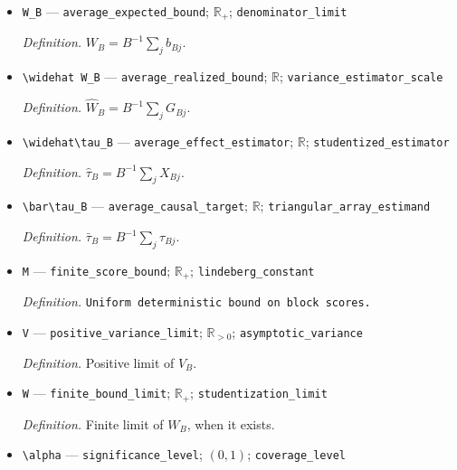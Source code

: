 \documentclass{article}
\begin{document}
\begin{itemize}
  \par\smallskip\noindent\emph{Definition.} \(V_B=B^{-1}\sum_j\sigma_{Bj}^2\).
  \item \texttt{W\_\allowbreak{}B} --- \texttt{average\_\allowbreak{}expected\_\allowbreak{}bound}; \(\mathbb R_+\); \texttt{denominator\_\allowbreak{}limit}
  \par\smallskip\noindent\emph{Definition.} \(W_B=B^{-1}\sum_jb_{Bj}\).
  \item \texttt{\textbackslash{}\allowbreak{}widehat W\_\allowbreak{}B} --- \texttt{average\_\allowbreak{}realized\_\allowbreak{}bound}; \(\mathbb R\); \texttt{variance\_\allowbreak{}estimator\_\allowbreak{}scale}
  \par\smallskip\noindent\emph{Definition.} \(\widehat W_B=B^{-1}\sum_jG_{Bj}\).
  \item \texttt{\textbackslash{}\allowbreak{}widehat\textbackslash{}\allowbreak{}tau\_\allowbreak{}B} --- \texttt{average\_\allowbreak{}effect\_\allowbreak{}estimator}; \(\mathbb R\); \texttt{studentized\_\allowbreak{}estimator}
  \par\smallskip\noindent\emph{Definition.} \(\widehat\tau_B=B^{-1}\sum_jX_{Bj}\).
  \item \texttt{\textbackslash{}\allowbreak{}bar\textbackslash{}\allowbreak{}tau\_\allowbreak{}B} --- \texttt{average\_\allowbreak{}causal\_\allowbreak{}target}; \(\mathbb R\); \texttt{triangular\_\allowbreak{}array\_\allowbreak{}estimand}
  \par\smallskip\noindent\emph{Definition.} \(\bar\tau_B=B^{-1}\sum_j\tau_{Bj}\).
  \item \texttt{M} --- \texttt{finite\_\allowbreak{}score\_\allowbreak{}bound}; \(\mathbb R_+\); \texttt{lindeberg\_\allowbreak{}constant}
  \par\smallskip\noindent\emph{Definition.} \texttt{Uniform deterministic bound on block scores.}
  \item \texttt{V} --- \texttt{positive\_\allowbreak{}variance\_\allowbreak{}limit}; \(\mathbb R_{>0}\); \texttt{asymptotic\_\allowbreak{}variance}
  \par\smallskip\noindent\emph{Definition.} Positive limit of \(V_B\).
  \item \texttt{W} --- \texttt{finite\_\allowbreak{}bound\_\allowbreak{}limit}; \(\mathbb R_+\); \texttt{studentization\_\allowbreak{}limit}
  \par\smallskip\noindent\emph{Definition.} Finite limit of \(W_B\), when it exists.
  \item \texttt{\textbackslash{}\allowbreak{}alpha} --- \texttt{significance\_\allowbreak{}level}; \((0,1)\); \texttt{coverage\_\allowbreak{}level}

\end{itemize}
\end{document}
